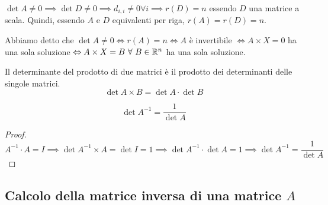 $\det{A} \neq 0 \implies \det{D} \neq 0 \implies d_{i,i} \neq 0 \forall i \implies r(D) = n$ essendo $D$ una matrice a scala. Quindi, essendo $A$ e $D$ equivalenti per riga, $r(A) = r(D) = n$.

Abbiamo detto che $\det{A} \neq 0 \iff r(A) = n \iff A$ \`e invertibile $\iff A \times X = 0$ ha una sola soluzione $\iff A \times X = B \forall B \in \reals^n$ ha una sola soluzione.

\begin{theorem}
Il determinante del prodotto di due matrici \`e il prodotto dei determinanti delle singole matrici.
\[
\det{A \times B} = \det{A} \cdot \det{B}
\]
\end{theorem}
\begin{cor}
\[
\det{A^{-1}} = \frac{1}{\det{A}}
\]
\end{cor}
\begin{proof}
\[
A^{-1} \cdot A = I \implies \det{A^{-1} \times A} = \det{I} = 1 
\implies \det{A^{-1}} \cdot \det{A} = 1 \implies \det{A^{-1}} = 
\frac{1}{\det{A}} 
\]
\end{proof}

\subsection{Calcolo della matrice inversa di una matrice $A$}

